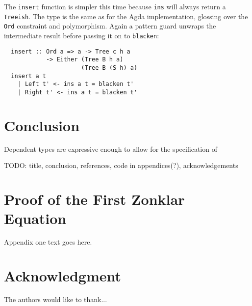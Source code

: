 \documentclass[journal, retainorgcmds]{IEEEtran}
\newcommand{\ihask}[1]{\texttt{#1}}
\begin{document}
The \ihask{insert} function is simpler this time because \ihask{ins} will
always return a \ihask{Treeish}.
The type is the same as for the Agda implementation, glossing over the
\ihask{Ord} constraint and polymorphism.
Again a pattern guard unwraps the intermediate result before passing it on to
\ihask{blacken}:

\begin{verbatim}
  insert :: Ord a => a -> Tree c h a
            -> Either (Tree B h a)
                      (Tree B (S h) a)
  insert a t
    | Left t' <- ins a t = blacken t'
    | Right t' <- ins a t = blacken t'
\end{verbatim}



\section{Conclusion}
Dependent types are expressive enough to allow for the specification of 

TODO: title, conclusion, references, code in appendices(?), acknowledgements

\appendices
\section{Proof of the First Zonklar Equation}
Appendix one text goes here.

\section*{Acknowledgment}


The authors would like to thank...





\end{document}
